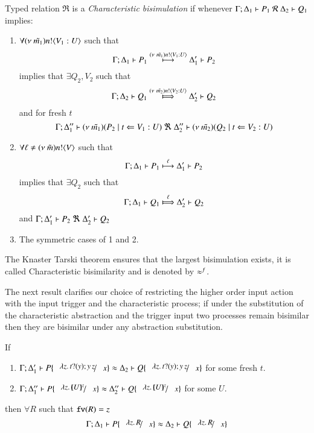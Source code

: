 \begin{definition}\rm
	\label{def:cbisim}
	Typed relation 
	$\Re$ is a {\em Characteristic bisimulation} if whenever
	$\horel{\Gamma}{\Delta_1}{P_1}{\ \mathcal{R}\ }{\Delta_2}{Q_1}$ implies:
	\begin{enumerate}
		\item	$\forall (\nu\ \tilde{m_1}) n ! \langle V_1: U \rangle$ such that %
			\[
				\Gamma; \Delta_1 \vdash P_1 \stackrel{(\nu\ \tilde{m_1}) n ! \langle V_1: U \rangle}{\longmapsto} \Delta_1' \vdash P_2
			\]
			implies that $\exists Q_2, V_2$ such that %
			\[
				\horel{\Gamma}{\Delta_2}{Q_1}{\Hby{\news{\tilde{m_2}} \bactout{n}{V_2: U}}}{\Delta_2'}{Q_2}
			\]
			and for fresh $t$
			\[
				\Gamma; \Delta_1'' \vdash (\nu\ \tilde{m_1})(P_2 \;|\; t \Leftarrow V_1:U) \ \Re\  \Delta_2'' \vdash{(\nu\ \tilde{m_2})(Q_2 \;|\;t \Leftarrow V_2:U)}
			\]
%
		\item	$\forall \ell \not= (\nu\ \tilde{m}) n ! \langle V \rangle$ such that
			\[
				\Gamma; \Delta_1 \vdash P_1 \stackrel{\ell}{\longmapsto} \Delta_1' \vdash P_2
			\]
			implies that $\exists Q_2$ such that 
			\[
				\horel{\Gamma}{\Delta_1}{Q_1}{\Hby{\ell}}{\Delta_2'}{Q_2}
			\]
			and
			$\horel{\Gamma}{\Delta_1'}{P_2}{\ \Re\ }{\Delta_2'}{Q_2}$

		\item	The symmetric cases of 1 and 2.
	\end{enumerate}
	The Knaster Tarski theorem ensures that the largest bisimulation exists,
	it is called Characteristic bisimilarity and is denoted by $\approx^{f}$.
\end{definition}

The next result clarifies our choice of restricting
the higher order input action with the input trigger and
the characteristic process; if under the substitution
of the characteristic abstraction and the trigger
input two processes remain bisimilar then they
are bisimilar under any abstraction substitution.

\begin{lemma}\rm
	\label{lem:proc_subst}
	If 
%
	\begin{enumerate}
		\item	$\horel{\Gamma}{\Delta_1'}{P \subst{\abs{z}{\binp{t}{y} \appl{y}{z}}}{x}}{\wb}{\Delta_2}{Q \subst{\abs{z}{\binp{t}{y} \appl{y}{z}}}{x}}$
			for some fresh $t$.

		\item	$\horel{\Gamma}{\Delta_1''}{P \subst{\abs{z}{\mapchar{U}{z}}}{x}}{\wb}{\Delta_2''}{Q \subst{\abs{z}{\mapchar{U}{z}}}{x}}$
			for some $U$.
	\end{enumerate}
%
	then $\forall R$ such that $\mathtt{fv}(R) = z$
\[
	\horel{\Gamma}{\Delta_1}{P \subst{\abs{z}{R}}{x}}{\wb}{\Delta_2}{Q \subst{\abs{z}{R}}{x}}
\]
\end{lemma}

